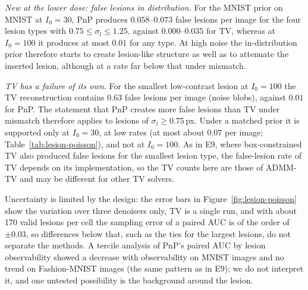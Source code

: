 \emph{New at the lower dose: false lesions in distribution.} For the MNIST prior on MNIST at $I_0=30$, PnP produces $0.058$--$0.073$ false lesions per image for the four lesion types with $0.75\le\sigma_l\le1.25$, against $0.000$--$0.035$ for TV,
whereas at $I_0=100$ it produces at most $0.01$ for any type. At high noise the in-distribution prior therefore starts to create lesion-like structure as well as to attenuate the inserted lesion, although at a rate far below that under mismatch.

\emph{TV has a failure of its own.} For the smallest low-contrast lesion at $I_0=100$ the TV reconstruction contains $0.63$ false lesions per image (noise blobs), against $0.01$ for PnP. The statement that PnP creates more false lesions than TV under mismatch therefore applies to lesions of $\sigma_l\ge0.75$\,px. Under a matched prior it is supported only at $I_0=30$, at low rates (at most about $0.07$ per image; Table~\ref{tab:lesion-poisson}), and not at $I_0=100$.
As in E9, where box-constrained TV also produced false lesions for the smallest lesion type, the false-lesion rate of TV depends on its implementation, so
the TV counts here are those of ADMM-TV and may be different for other TV solvers.

Uncertainty is limited by the design: the error bars in Figure~\ref{fig:lesion-poisson} show the variation over three denoisers only, TV is a single run, and with about 170 valid lesions per cell the sampling error of a paired AUC is of the order of $\pm0.03$, so differences below that, such as the ties for the
largest lesions, do not separate the methods. A tercile analysis of PnP's paired AUC by lesion observability showed a decrease with observability on MNIST images and no trend on Fashion-MNIST images (the same pattern as in E9); we do not interpret it, and one untested possibility is the background around the lesion.

